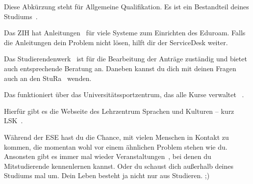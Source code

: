 Diese Abkürzung steht für Allgemeine Qualifikation. Es ist ein Bestandteil deines Studiums~.


Das ZIH hat Anleitungen~ für viele Systeme zum Einrichten des Eduroam. Falls die Anleitungen dein Problem nicht lösen, hilft dir der ServiceDesk weiter.

Das Studierendenwerk~ ist für die Bearbeitung der Anträge zuständig und bietet auch entsprechende Beratung an. Daneben kannst du dich mit deinen Fragen auch an den StuRa~ wenden.

Das funktioniert über das Universitätssportzentrum, das alle Kurse verwaltet~ .

Hierfür gibt es die Webseite des Lehrzentrum Sprachen und Kulturen -- kurz LSK~.

Während der ESE hast du die Chance, mit vielen Menschen in Kontakt zu kommen, die momentan wohl vor einem ähnlichen Problem stehen wie du.
Ansonsten gibt es immer mal wieder Veranstaltungen~, bei denen du Mitstudierende kennenlernen kannst.
Oder du schaust dich außerhalb deines Studiums mal um. Dein Leben besteht ja nicht nur aus Studieren. ;)

